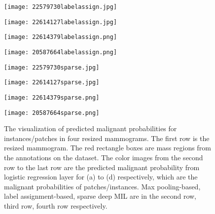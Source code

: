 \documentclass[runningheads,a4paper]{llncs}
\begin{document}
\begin{figure}[!t]
\begin{center}
		\begin{minipage}{0.15\linewidth}
			\centerline{\texttt{[image: 22579730labelassign.jpg]}}
		\end{minipage}
		\hspace{1cm}
		\begin{minipage}{0.15\linewidth}
			\centerline{\texttt{[image: 22614127labelassign.jpg]}}
		\end{minipage}
		\hspace{1cm}
		\begin{minipage}{0.15\linewidth}
			\centerline{\texttt{[image: 22614379labelassign.png]}}
		\end{minipage}
		\hspace{1cm}
		\begin{minipage}{0.15\linewidth}
			\centerline{\texttt{[image: 20587664labelassign.png]}}
		\end{minipage}
		\vfill
		\begin{minipage}{0.15\linewidth}
			\centerline{\texttt{[image: 22579730sparse.jpg]}}
		\end{minipage}
		\hspace{1cm}
		\begin{minipage}{0.15\linewidth}
			\centerline{\texttt{[image: 22614127sparse.jpg]}}
		\end{minipage}
		\hspace{1cm}
		\begin{minipage}{0.15\linewidth}
			\centerline{\texttt{[image: 22614379sparse.png]}}
		\end{minipage}
		\hspace{1cm}
		\begin{minipage}{0.15\linewidth}
			\centerline{\texttt{[image: 20587664sparse.png]}}
		\end{minipage}
		\caption{The visualization of predicted malignant probabilities for instances/patches in four resized mammograms. The first row is the resized mammogram. The red rectangle boxes are mass regions from the annotations on the dataset. The color images from the second row to the last row are the predicted malignant probability from logistic regression layer for (a) to (d) respectively, which are the malignant probabilities of patches/instances. Max pooling-based, label assignment-based, sparse deep MIL are in the second row, third row, fourth row respectively.}
		\label{fig:visresponse}
	\end{center}
\end{figure}
\end{document}
